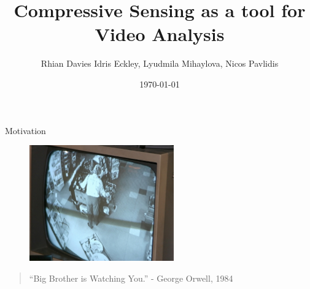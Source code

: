 \documentclass{beamer}
\begin{document}
\title{Compressive Sensing as a tool for Video Analysis}
\subtitle{}
\author{Rhian Davies \newline Idris Eckley, Lyudmila Mihaylova, Nicos Pavlidis}
\date{\today}

\begin{frame}[plain] 
  \titlepage
\end{frame}

  \begin{frame}{Motivation}
  \begin{figure}[h]
  \centering
  \includegraphics[height=5cm]{cctv}
  \label{fig:cctv}
\end{figure}  

\begin{quote}
\centering  ``Big Brother is Watching You.'' 
 \newline -  George Orwell, 1984  
\end{quote}  
 \end{frame}
\end{document}
